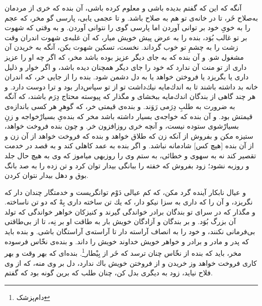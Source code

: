 آنگه كه اين كه گفتم بديده باشى و معلوم كرده باشى، آن بنده كه خرى از مردمان به‌صلاح خَر، تا در خانه‌ی تو هم به صلاح باشد. و تا عجمى يابى، پارسى گو مخر، كه عجم را به‌ خوىِ خود بر توانى آوردن اما پارسى گوى را نتوانى آوردن. و به وقتى كه شهوت بر تو غالب بُوَد، بنده را به عرض پيش خويش ميار، كه آن غلبه‌ی شهوت اندران وقت زشت را به چشمِ تو خوب گرداند. نخست، تسكين شهوت بكن، آنگه به خريدن آن مشغول شو. و آن بنده كه به جاى ديگر عزيز بوده باشد مخر، كه اگر چه او را عزيز دارى از تو منت آن ندارد كه خود را جاى ديگر همچنان ديده باشد، و اگر خوار و ذليل دارى يا بگريزد يا فروختن خواهد يا به دل دشمن شود. بنده را از جايى خر، كه اندران خانه بد داشته باشند تا به اندك‌مايه نيك‌داشت تو از تو سپاس‌دار بود و ترا دوست دارد. و هر چند گاهى از بندگان اندك‌مايه ببخشاى و مگذار كه پيوسته محتاج دِرَم باشند، كه آنگه به ضرورت به طلبِ دِرَمى‌ رَوَند. و بنده‌ی قيمتى خر، كه گوهرِ هر كسى باندازه‌ی قيمتش بود. و آن بنده كه خواجه‌ی بسيار داشته باشد مخر كه بنده‌یِ بسيارْخواجه و زنِ بسيارْشوى ستوده نيست، و آنچه خرى روزافزون خر. و چون بنده فروخت خواهد، ستيزه مكن و بفروش از آنكه زن كه طلاق خواهد و بنده كه فروخت خواهد از آن زن و از آن بنده [هيچ كس] شادمانه نباشد. و اگر بنده به عمد كاهلى كند و به قصد در خدمت تقصير كند نه به سهوى و خطائى، به ستم وى را روزبهى مياموز كه وى به هيچ حال جلد و روزبه نشود؛ زود بفروش كه خفته را ببانگى بيدار توان كرد و تن زده را به صد بانگ بوق و دهل بيدار نتوان كردن.

و عيال نابكار آينده گرد مكن، كه كم عيالى دَوْم توانگريست و خدمتگار چندان دار كه نگريزد، و آن را كه دارى به سزا نيكو دار، كه يك تن ساخته دارى بِهْ كه دو تن ناساخته. و مگذار كه در سراى تو بندگان برادر خواندگى گيرند و كنيزكان خواهر خواندگى كه تولد آن بزرگ بُوَد. و بر بندگان و آزادگان خويش بار به طاقت او بر نِه، تا از بى‌طاقتى بى‌فرمانى نكنند، و خود را به انصاف آراسته دار تا آراسته‌ی آراستگان باشى. و بنده بايد كه پدر و مادر و برادر و خواهر خويش خداوند خويش را داند. و بنده‌ی نخّاس فرسوده مخر، بايد كه بنده از نخّاس چنان ترسد كه خَر از بِيْطار\footnote{دام‌پزشک}. بنده‌اى كه بهر وقت و بهر كارى فروخت خواهد وز خريدن و از فروختن خويش باك ندارد، دل بر وى منه، كه از وى فلاح نيايد، زود به ديگرى بدل كن، چنان طلب كه برين گونه بود كه گفتم.


\newpage
